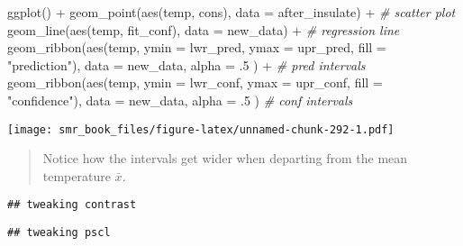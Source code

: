 \documentclass[
  oneside]{book}
\newenvironment{Shaded}{\begin{snugshade}}{\end{snugshade}}
\newcommand{\AttributeTok}[1]{\textcolor[rgb]{0.77,0.63,0.00}{#1}}
\newcommand{\CommentTok}[1]{\textcolor[rgb]{0.56,0.35,0.01}{\textit{#1}}}
\newcommand{\DecValTok}[1]{\textcolor[rgb]{0.00,0.00,0.81}{#1}}
\newcommand{\FunctionTok}[1]{\textcolor[rgb]{0.00,0.00,0.00}{#1}}
\newcommand{\NormalTok}[1]{#1}
\newcommand{\SpecialCharTok}[1]{\textcolor[rgb]{0.00,0.00,0.00}{#1}}
\newcommand{\StringTok}[1]{\textcolor[rgb]{0.31,0.60,0.02}{#1}}
\begin{document}
\begin{Shaded}
\begin{Highlighting}[]
\FunctionTok{ggplot}\NormalTok{() }\SpecialCharTok{+}
  \FunctionTok{geom\_point}\NormalTok{(}\FunctionTok{aes}\NormalTok{(temp, cons), }\AttributeTok{data =}\NormalTok{ after\_insulate) }\SpecialCharTok{+} \CommentTok{\# scatter plot}
  \FunctionTok{geom\_line}\NormalTok{(}\FunctionTok{aes}\NormalTok{(temp, fit\_conf), }\AttributeTok{data =}\NormalTok{ new\_data) }\SpecialCharTok{+} \CommentTok{\# regression line}
  \FunctionTok{geom\_ribbon}\NormalTok{(}\FunctionTok{aes}\NormalTok{(temp, }\AttributeTok{ymin =}\NormalTok{ lwr\_pred, }\AttributeTok{ymax =}\NormalTok{ upr\_pred, }\AttributeTok{fill =} \StringTok{"prediction"}\NormalTok{),}
    \AttributeTok{data =}\NormalTok{ new\_data, }\AttributeTok{alpha =}\NormalTok{ .}\DecValTok{5}
\NormalTok{  ) }\SpecialCharTok{+} \CommentTok{\# pred intervals}
  \FunctionTok{geom\_ribbon}\NormalTok{(}\FunctionTok{aes}\NormalTok{(temp, }\AttributeTok{ymin =}\NormalTok{ lwr\_conf, }\AttributeTok{ymax =}\NormalTok{ upr\_conf, }\AttributeTok{fill =} \StringTok{"confidence"}\NormalTok{),}
    \AttributeTok{data =}\NormalTok{ new\_data, }\AttributeTok{alpha =}\NormalTok{ .}\DecValTok{5}
\NormalTok{  ) }\CommentTok{\# conf intervals}
\end{Highlighting}
\end{Shaded}

\texttt{[image: smr\_book\_files/figure-latex/unnamed-chunk-292-1.pdf]}

\begin{quote}
Notice how the intervals get wider when departing from the mean temperature \(\bar x\).
\end{quote}

\begin{verbatim}
## tweaking contrast
\end{verbatim}

\begin{verbatim}
## tweaking pscl
\end{verbatim}

  
\end{document}
